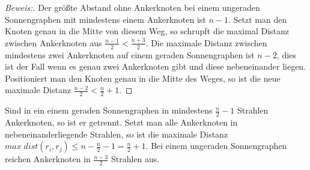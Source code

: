 \begin{proof}[Beweis:]
Der größte Abstand ohne Ankerknoten bei einem ungeraden Sonnengraphen mit mindestens einem Ankerknoten ist $n-1$. Setzt man den Knoten genau in die Mitte von diesem Weg, so schrupft die maximal Distanz zwischen Ankerknoten aus $\frac{n-1}{2}<\frac{n+3}{2}$.\newline\newline
Die maximale Distanz zwischen mindestens zwei Ankerknoten auf einem geraden Sonnengraphen ist $n-2$, dies ist der Fall wenn es genau zwei Ankerknoten gibt und diese nebeneinander liegen. Positioniert man den Knoten genau in die Mitte des Weges, so ist die neue maximale Distanz $\frac{n-2}{2}<\frac{n}{2}+1$.
\end{proof}
\begin{folg}
Sind in ein einem geraden Sonnengraphen in mindestens $\frac{n}{2}-1$ Strahlen Ankerknoten, so ist er getrennt. Setzt man alle Ankerknoten in nebeneinanderliegende Strahlen, so ist die maximale Distanz $max\;dist(r_i,r_j) \leq n-\frac{n}{2}-1=\frac{n}{2}+1$. Bei einem ungeraden Sonnengraphen reichen Ankerknoten in $\frac{n-3}{2}$ Strahlen aus.
\end{folg}
